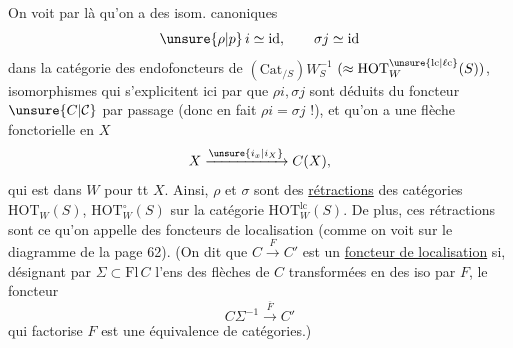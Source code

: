 On voit par là qu'on a des isom. canoniques
\[
 \unsure{\rho|p}\,i\simeq\mathrm{id},\qquad \sigma j\simeq\mathrm{id}
\]
dans la catégorie des endofoncteurs de $(\mathrm{Cat}_{/S})W_S^{-1}$ $(\approx\mathrm{HOT}^{\unsure{\mathrm{lc}|\ell\mathrm{c}}}_W(S))$,  isomorphismes qui s'explicitent ici par   que $\rho i,\sigma j$ sont déduits du foncteur $\unsure{C|\mathcal C}$ par passage   (donc en fait $\rho i=\sigma j$ !), et qu'on a une  flèche fonctorielle en $X$
\[
 X\xrightarrow{\unsure{i_x|i_X}}C(X),
\]
qui est dans $W$ pour tt $X$. Ainsi, $\rho$ et $\sigma$ sont  des \uline{rétractions} des  catégories $\mathrm{HOT}_W(S)$, $\mathrm{HOT}_W^\circ(S)$ sur la catégorie $\mathrm{HOT}_W^{\mathrm{lc}}(S)$.  De  plus, ces rétractions sont   ce qu'on appelle des foncteurs de localisation (comme on voit sur le diagramme de la page 62). (On dit que $C\xrightarrow{F}C'$ est un \uline{foncteur de localisation} si, désignant par $\Sigma\subset\mathrm{Fl}\,C$ l'ens des flèches de $C$ transformées en des iso par $F$, le foncteur
\[
 C\Sigma^{-1}\xrightarrow{\overline F}C'
\]
qui factorise $F$ est une équivalence de catégories.)
